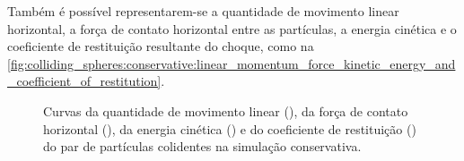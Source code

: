 Também é possível representarem-se a quantidade de movimento linear horizontal, a força de contato horizontal entre as partículas, a energia cinética e o coeficiente de restituição resultante do choque, como na \cref{fig:colliding_spheres:conservative:linear_momentum_force_kinetic_energy_and_coefficient_of_restitution}.

\begin{figure}[htb!]
	\caption[Curvas da quantidade de movimento linear, da força de contato horizontal, da energia cinética e do coeficiente de restituição do par de partículas colidentes na simulação conservativa.]{Curvas da quantidade de movimento linear (), da força de contato horizontal (), da energia cinética () e do coeficiente de restituição () do par de partículas colidentes na simulação conservativa.}
	\centering
	\captionsetup[subfloat]{labelfont=bf}
\end{figure}
